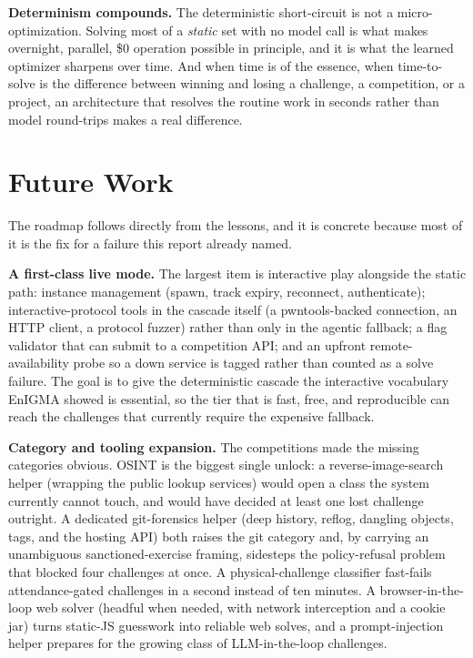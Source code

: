 \documentclass[10pt,twocolumn]{article}
\begin{document}
\medskip
\textbf{Determinism compounds.} The deterministic short-circuit is not a micro-optimization. Solving most of a
\emph{static} set with no model call is what makes overnight, parallel, \$0 operation possible in principle,
and it is what the learned optimizer sharpens over time. And when time is of the essence, when time-to-solve
is the difference between winning and losing a challenge, a competition, or a project, an architecture that
resolves the routine work in seconds rather than model round-trips makes a real difference.

\section{Future Work}
\label{sec:future}

The roadmap follows directly from the lessons, and it is concrete because most of it is the fix for a
failure this report already named.

\medskip
\textbf{A first-class live mode.} The largest item is interactive play alongside the static path: instance
management (spawn, track expiry, reconnect, authenticate); interactive-protocol tools in the cascade itself (a
pwntools-backed connection, an HTTP client, a protocol fuzzer) rather than only in the agentic fallback; a
flag validator that can submit to a competition API; and an upfront remote-availability probe so a down
service is tagged rather than counted as a solve failure. The goal is to give the deterministic cascade the
interactive vocabulary EnIGMA showed is essential, so the tier that is fast, free, and reproducible can reach
the challenges that currently require the expensive fallback.

\medskip
\textbf{Category and tooling expansion.} The competitions made the missing categories obvious. OSINT is the
biggest single unlock: a reverse-image-search helper (wrapping the public lookup services) would open a class
the system currently cannot touch, and would have decided at least one lost challenge outright. A dedicated
git-forensics helper (deep history, reflog, dangling objects, tags, and the hosting API) both raises the git
category and, by carrying an unambiguous sanctioned-exercise framing, sidesteps the policy-refusal problem that
blocked four challenges at once. A physical-challenge classifier fast-fails attendance-gated challenges in a
second instead of ten minutes. A browser-in-the-loop web solver (headful when needed, with network
interception and a cookie jar) turns static-JS guesswork into reliable web solves, and a prompt-injection
helper prepares for the growing class of LLM-in-the-loop challenges.
\end{document}
